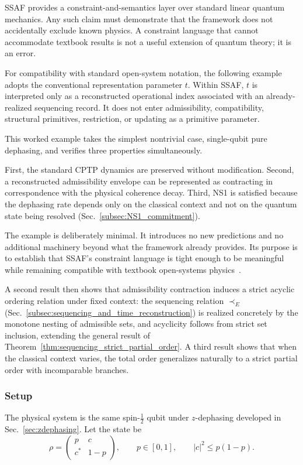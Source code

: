\documentclass[aps,prx,onecolumn,11pt]{revtex4-2}
\theoremstyle{plain}
\theoremstyle{definition}
\theoremstyle{remark}
\begin{document}
SSAF provides a constraint-and-semantics layer over standard linear
quantum mechanics. Any such claim must demonstrate that the framework
does not accidentally exclude known physics. A constraint language that
cannot accommodate textbook results is not a useful extension of
quantum theory; it is an error.

For compatibility with standard open-system notation, the following
example adopts the conventional representation parameter \(t\). Within
SSAF, \(t\) is interpreted only as a reconstructed operational index
associated with an already-realized sequencing record. It does not enter
admissibility, compatibility, structural primitives, restriction, or
updating as a primitive parameter.

This worked example takes the simplest nontrivial case, single-qubit
pure dephasing, and verifies three properties simultaneously.

First, the standard CPTP dynamics are preserved without modification.
Second, a reconstructed admissibility envelope can be represented as
contracting in correspondence with the physical coherence decay. Third,
NS1 is satisfied because the dephasing rate depends only on the
classical context and not on the quantum state being resolved
(Sec.~\ref{subsec:NS1_commitment}).

The example is deliberately minimal. It introduces no new predictions
and no additional machinery beyond what the framework already provides.
Its purpose is to establish that SSAF's constraint language is tight
enough to be meaningful while remaining compatible with textbook
open-systems physics~\cite{BreuerPetruccione2002,Schlosshauer2007}.

A second result then shows that admissibility contraction induces a
strict acyclic ordering relation under fixed context: the sequencing
relation \(\prec_E\)
(Sec.~\ref{subsec:sequencing_and_time_reconstruction}) is realized
concretely by the monotone nesting of admissible sets, and acyclicity
follows from strict set inclusion, extending the general result of
Theorem~\ref{thm:sequencing_strict_partial_order}. A third result shows
that when the classical context varies, the total order generalizes
naturally to a strict partial order with incomparable branches.

\subsubsection{Setup}

The physical system is the same spin-\(\tfrac{1}{2}\) qubit under
\(z\)-dephasing developed in Sec.~\ref{sec:zdephasing}. Let the state be
\begin{equation}
\rho =
\begin{pmatrix}
p & c \\
c^* & 1-p
\end{pmatrix},
\qquad
p\in[0,1],
\qquad
|c|^2\leq p(1-p).
\label{eq:wk_qubit_density_form}
\end{equation}
\end{document}
